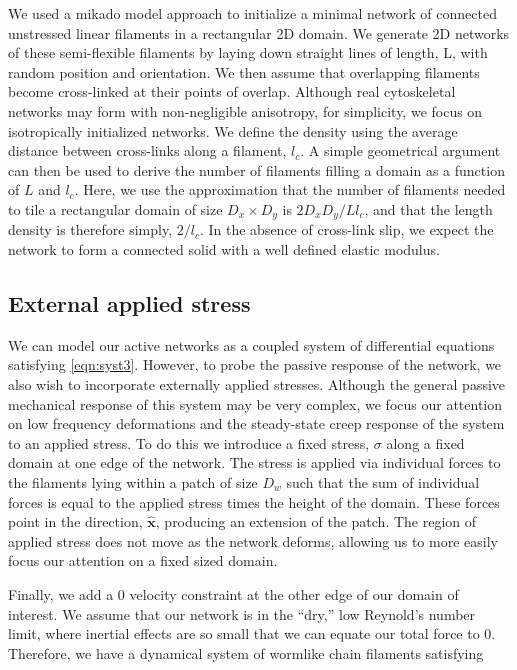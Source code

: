 We used a mikado model approach \cite{Unterberger2014} to initialize a minimal network of connected unstressed linear filaments in a rectangular 2D domain. We generate 2D networks of these semi-flexible filaments by laying down straight lines of length, L, with random position and orientation. We then assume that overlapping filaments become cross-linked at their points of overlap. Although real cytoskeletal networks may form with non-negligible anisotropy, for simplicity, we focus on isotropically initialized networks. We define the density using the average distance between cross-links along a filament, $l_c$. A simple geometrical argument can then be used to derive the number of filaments filling a domain as a function of $L$ and $l_c$\cite{theo_hlm}.  Here, we use the approximation that the number of filaments needed to tile a rectangular domain of size $D_x \times D_y$  is $2D_xD_y/Ll_c$, and that the length density is therefore simply, $2/l_c$. In the absence of cross-link slip, we expect the network to form a connected solid with a well defined elastic modulus\cite{theo_hlm,theo_hlm2}.


\subsection{External applied stress}
We can model our active networks as a coupled system of differential equations satisfying \ref{eqn:syst3}.  However, to probe the passive response of the network, we also wish to incorporate externally applied stresses.  Although the general passive mechanical response of this system may be very complex, we focus our attention on low frequency deformations and the steady-state creep response of the system to an applied stress.  To do this we introduce a fixed stress, $\sigma$ along a fixed domain at one edge of the network.  The stress is applied via individual forces to the filaments lying within a patch of size $D_w$ such that the sum of individual forces is equal to the applied stress times the height of the domain.  These forces point in the direction, $\mathbf{\hat{x}}$, producing an extension of the patch.  The region of applied stress does not move as the network deforms, allowing us to more easily focus our attention on a fixed sized domain. 

Finally, we add a 0 velocity constraint at the other edge of our domain of interest.  We assume that our network is in the ``dry,'' low Reynold's number limit, where inertial effects are so small that we can equate our total force to 0.  Therefore, we have a dynamical system of wormlike chain filaments satisfying

